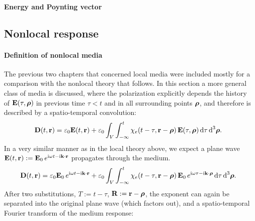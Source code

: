 \paragraph{Energy and Poynting vector}  %

\subsection{Nonlocal response} %
\paragraph{Definition of nonlocal media}%
The previous two chapters that concerned local media were included mostly for a comparison with the nonlocal theory that follows.
In this section a more general class of media is discussed, where the polarization explicitly depends the history of $\mathbf{E}(\tau, \boldsymbol{\rho})$ in previous time $\tau < t$ and in all surrounding points $\boldsymbol{\rho}$, and therefore is described by a spatio-temporal convolution:
\begin{equation} \mathbf{D}(t,{\mathbf{r}}) = \varepsilon_0 \mathbf{E}(t,{\mathbf{r}}) + \varepsilon_0\int_{V} \int_{-\infty}^{t} \chi_e(t-\tau, {\mathbf{r}}-\boldsymbol{\rho}) \, \mathbf{E}(\tau,\boldsymbol{\rho}) \,\mbox{d}\tau \,\mbox{d}^3\boldsymbol{\rho}. \label{eq_chi_convol_nonloc}\end{equation}
In a very similar manner as in the local theory above, we expect a plane wave $\mathbf{E}(t, {\mathbf{r}}) := \mathbf{E}_0 \, e^{{\mathrm i}\omega t - {\mathrm i}{\mathbf{k}}\cdot{\mathbf{r}}}$ propagates through the medium. 
\begin{equation} \mathbf{D}(t,{\mathbf{r}}) = \varepsilon_0 \mathbf{E}_0 \, e^{{\mathrm i}\omega t - {\mathrm i}{\mathbf{k}}\cdot{\mathbf{r}}} + \varepsilon_0\int_{V} \int_{-\infty}^{t} \chi_e(t-\tau, {\mathbf{r}}-\boldsymbol{\rho}) \, \mathbf{E}_0 \, e^{{\mathrm i}\omega \tau - {\mathrm i}{\mathbf{k}}\cdot\boldsymbol{\rho}} \,\mbox{d}\tau \,\mbox{d}^3\boldsymbol{\rho}. \label{eq_chi_convol_harm_nonloc}\end{equation}
After two  substitutions, $T:=t-\tau$, $\mathbf{R}:={\mathbf{r}}-\boldsymbol{\rho}$, the exponent can again be separated into the original plane wave (which factors out), and a spatio-temporal Fourier transform of the medium response:
